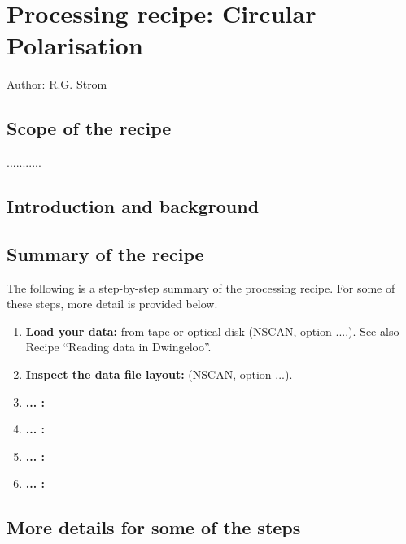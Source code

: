 %
%
\chapter{Processing recipe: Circular Polarisation}
\tableofcontents 

Author: R.G. Strom

\section{Scope of the recipe}
\label{.scope}

...........




\section{Introduction and background}
\label{.intro}


\section{Summary of the recipe}
\label{.summary}

The following is a step-by-step summary of the processing recipe.
For some of these steps, more detail is provided below.

\begin{enumerate}
\item {\bf Load your data:} 
from tape or optical disk (NSCAN, option ....).
See also Recipe ``Reading data in Dwingeloo''.
\item {\bf Inspect the data file layout:} (NSCAN, option ...).
\item {\bf ... :}
\item {\bf ... :}
\item {\bf ... :}
\item {\bf ... :}
\end{enumerate}


\section{More details for some of the steps}
\label{.detail}

